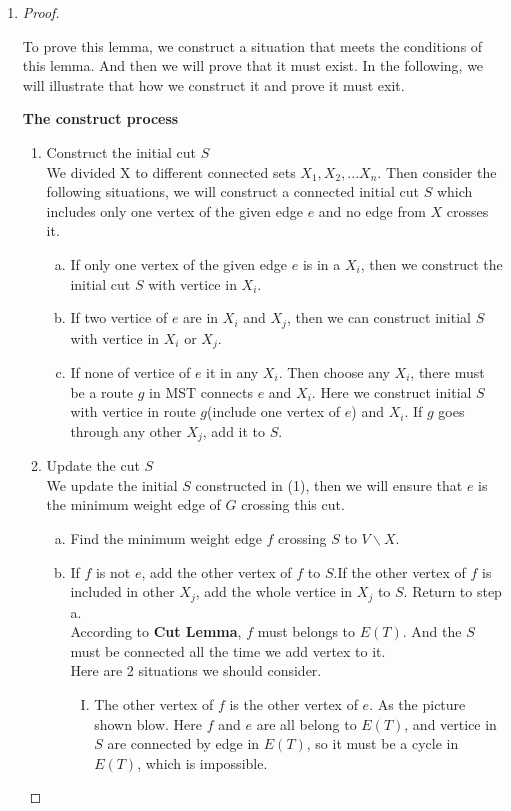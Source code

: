 \documentclass[12pt, notitlepage]{article}
\begin{document}
\begin{enumerate}
\item 
\begin{proof}
	\mbox{ }
	
	\qquad To prove this lemma, we construct a situation that meets the conditions of this lemma. And then we will prove that it must exist. In the following, we will illustrate that how we construct it and prove it must exit.
	
	\textbf{The construct process}
	\begin{enumerate}[(1)]
		\item Construct the initial cut $S$\\
		We divided X to different connected sets $X_1,X_2,...X_n$. Then consider the following situations, we will construct a connected initial cut $S$ which includes only one vertex of the given edge $e$ and no edge from $X$ crosses it.
		\begin{enumerate}[a.]
			\item If only one vertex of the given edge $e$ is in a $X_i$, then we construct the initial cut $S$ with vertice in $X_i$.
			\item If two vertice of $e$ are in $X_i$ and $X_j$, then we can construct initial $S$ with vertice in $X_i$ or $X_j$.
			\item If none of vertice of $e$ it in any $X_i$. Then choose any $X_i$, there must be a route $g$ in MST connects $e$ and $X_i$. Here we construct initial $S$ with vertice in route $g$(include one vertex of $e$) and $X_i$. If $g$ goes through any other $X_j$, add it to $S$.
		\end{enumerate}
		\item Update the cut $S$\\
		We update the initial $S$ constructed in (1), then we will ensure that $e$ is the minimum weight edge of $G$ crossing this cut.
		\begin{enumerate}[a.]
			\item Find the minimum weight edge $f$ crossing $S$ to $V\backslash X$. 
			\item If $f$ is not $e$, add the other vertex of $f$ to $S$.If the other vertex of $f$ is included in other $X_j$, add the whole vertice in $X_j$ to $S$. Return to step a.\\
			According to \textbf{Cut Lemma}, $f$ must belongs to $E(T)$. And the $S$ must be connected all the time we add vertex to it. \\
			Here are 2 situations we should consider. 
			\begin{enumerate}[I.]
				\item The other vertex of $f$ is the other vertex of $e$. As the picture shown blow. Here $f$ and $e$ are all belong to $E(T)$, and vertice in $S$ are connected by edge in $E(T)$, so it must be a cycle in $E(T)$, which is impossible.

\end{enumerate}
\end{enumerate}
\end{enumerate}
\end{proof}
\end{enumerate}
\end{document}
